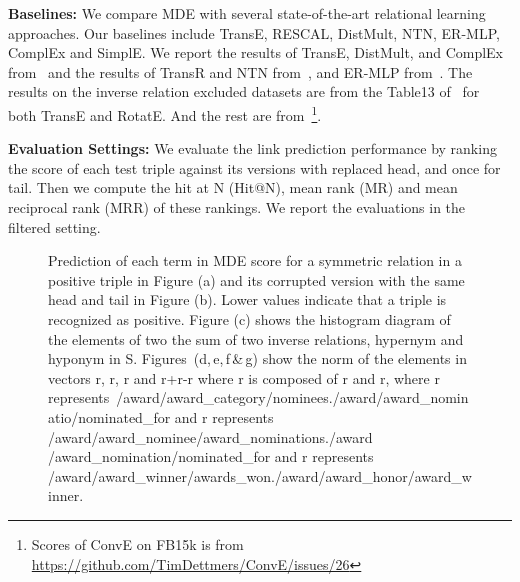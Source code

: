 \documentclass{ecai}
\begin{document}
\textbf{Baselines:} We compare MDE with several state-of-the-art relational learning approaches. Our baselines include TransE, RESCAL, DistMult, NTN, ER-MLP, ComplEx and SimplE. We report the results of TransE, DistMult, and ComplEx from~\cite{trouillon2016complex} and the results of TransR and NTN from~\cite{nguyen2017overview}, and ER-MLP from~\cite{nickel2016holographic}. The results on the inverse relation excluded datasets are from the Table13 of~\cite{sun2019rotate} for both TransE and RotatE. And the rest are from~\cite{dettmers2018convolutional}\footnote{Scores of ConvE on FB15k is from \url{https://github.com/TimDettmers/ConvE/issues/26}}.

\textbf{Evaluation Settings:} 
We evaluate the link prediction performance by ranking the score of each test triple against its versions with replaced head, and once for tail. Then we compute the hit at N (Hit@N), mean rank (MR) and mean reciprocal rank (MRR) of these rankings. We report the evaluations in the filtered setting. \begin{figure*}[t]
 \centering
  \hspace{1em}
    
    
    
    \caption{Prediction of each term in MDE score for a symmetric relation in a positive triple in Figure (a) and its corrupted version with the same head and tail in Figure (b). Lower values indicate that a triple is recognized as positive. Figure (c) shows the histogram diagram of the elements of two the sum of two inverse relations, hypernym and hyponym in S. Figures~(d,\,e,\,f\,\&\,g) show the norm of the elements in vectors r, r, r and r+r-r where r is composed of r and r, where r represents~\footnotesize/award/award\_category/nominees./award/award\_nominatio/nominated\_for \normalsize and r represents  \footnotesize/award/award\_nominee/award\_nominations./award /award\_nomination/nominated\_for \normalsize and r represents  \footnotesize /award/award\_winner/awards\_won./award/award\_honor/award\_winner\normalsize.} 
\label{fig:relationPatterns}
\end{figure*}
\end{document}
